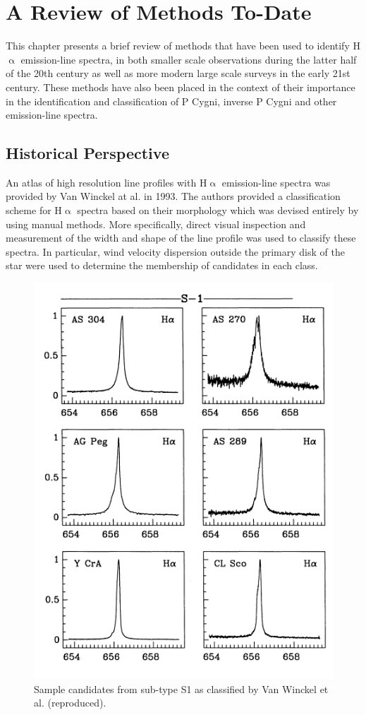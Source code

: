 \chapter{A Review of Methods To-Date}

This chapter presents a brief review of methods that have been used to identify H$\upalpha$ emission-line spectra, in both smaller scale observations during the latter half of the 20th century as well as more modern large scale surveys in the early 21st century. These methods have also been placed in the context of their importance in the identification and classification of P Cygni, inverse P Cygni and other emission-line spectra.

\section{Historical Perspective}
An atlas of high resolution line profiles with H$\upalpha$ emission-line spectra was provided by Van Winckel at al. in 1993\cite{van1993atlas}. The authors provided a classification scheme for H$\upalpha$ spectra based on their morphology which was devised entirely by using manual methods. More specifically, direct visual inspection and measurement of the width and shape of the line profile was used to classify these spectra. In particular, wind velocity dispersion outside the primary disk of the star were used to determine the membership of candidates in each class.

\begin{figure}[!htb]
\centering
\includegraphics[scale=0.75]{figures/van winckel class.png}
\caption{Sample candidates from sub-type S1 as classified by Van Winckel et al. (reproduced).}
\end{figure}

